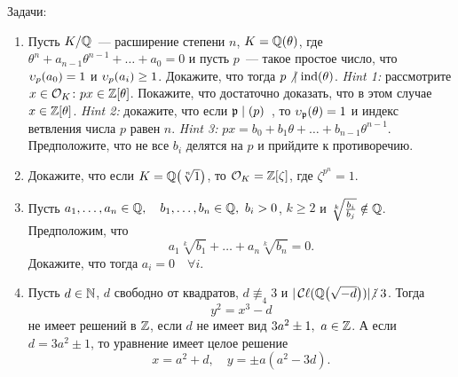 	\begin{homework}\label{hw_7}
		Задачи:
		\begin{enumerate}
			\item Пусть $K/\mathbb{Q}$~--- расширение степени $n$, $K = \mathbb{Q}(\theta)$, где $\theta^n + a_{n - 1}\theta^{n - 1} + \ldots + a_0 = 0$ и пусть $p$~--- такое простое число, что $\upsilon_{p}(a_0) = 1$ и $\upsilon_{p}(a_i) \ge 1$. Докажите, что тогда $p \not \ \mid \operatorname{ind}(\theta)$.
			\emph{Hint 1:} рассмотрите $x \in \mathcal{O}_{K}\colon px \in \mathbb{Z}[\theta]$. Покажите, что достаточно доказать, что в этом случае $x \in \mathbb{Z}[\theta]$. \emph{Hint 2:} докажите, что если $\mathfrak{p} \mid (p)$~, то $\upsilon_{\mathfrak{p}}(\theta) = 1$ и индекс ветвления числа $p$ равен $n$. \emph{Hint 3:} $px = b_0 + b_1 \theta + \ldots + b_{n - 1}\theta^{n - 1}$. Предположите, что не все $b_i$ делятся на $p$ и прийдите к противоречию. 

			\item Докажите, что если $K = \Q\lr*{\sqrt[n]{1}}$, то $\mathcal{O}_{K} = \mathbb{Z}[\zeta]$, где  $\zeta^{p^n} = 1$. 

			\item  Пусть $a_1, \ldots, a_n \in \mathbb{Q}, \quad b_1, \ldots, b_n \in \mathbb{Q}, \ b_i > 0$, $k \ge 2$ и $\sqrt[k]{\frac{b_i}{b_j}} \notin \mathbb{Q}$. Предположим, что 
			\[
				a_1 \sqrt[k]{b_1} + \ldots + a_n \sqrt[k]{b_n} = 0.
			\]
			Докажите, что тогда $a_i = 0 \quad \forall i$. 
			\item \begin{theorem}[Баше] 
				Пусть $d \in \mathbb{N}$, $d$ свободно от квадратов, $d \not\equiv_{4} 3$ и $|\Class(\Q\lr*{\sqrt{-d}})| \notdivby 3$. Тогда 
				\[
					y^2 = x^3 - d
				\]
				не имеет решений в $\mathbb{Z}$, если $d$ не имеет вид $3 a^2 \pm 1, \ a \in \mathbb{Z}$. А если $d = 3a^2 \pm 1$, то  уравнение имеет целое решение 
				\[
					x = a^2 + d, \quad y = \pm a (a^2 - 3d).
				\]
			\end{theorem}

		\end{enumerate}
	\end{homework}



